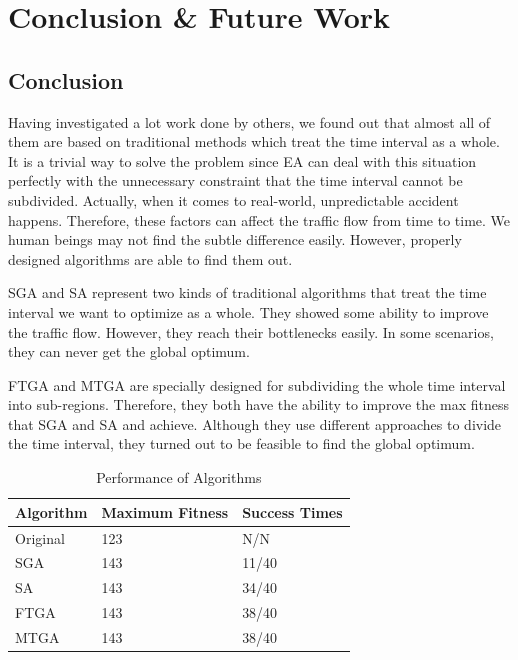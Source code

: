 \documentclass{article} %
\begin{document}
\section{Conclusion \& Future Work}
\subsection{Conclusion}
Having investigated a lot work done by others, we found out that almost all of them are based on traditional methods which treat the time interval as a whole. It is a trivial way to solve the problem since EA can deal with this situation perfectly with the unnecessary constraint that the time interval cannot be subdivided. Actually, when it comes to real-world, unpredictable accident happens. Therefore, these factors can affect the traffic flow from time to time. We human beings may not find the subtle difference easily. However, properly designed algorithms are able to find them out.

SGA and SA represent two kinds of traditional algorithms that treat the time interval we want to optimize as a whole. They showed some ability to improve the traffic flow. However, they reach their bottlenecks easily. In some scenarios, they can never get the global optimum. 

FTGA and MTGA are specially designed for subdividing the whole time interval into sub-regions. Therefore, they both have the ability to improve the max fitness that SGA and SA and achieve. Although they use different approaches to divide the time interval, they turned out to be feasible to find the global optimum. 

\begin{table}
\centering
\renewcommand\arraystretch{2}
    \begin{tabular}{|l|l|l|}
    \hline
    \textbf{Algorithm} & \textbf{Maximum Fitness} & \textbf{Success Times} \\ \hline
    Original  & 123             & N/N             \\ \hline
    SGA       & 143             & 11/40           \\ \hline
    SA        & 143             & 34/40           \\ \hline
    FTGA      & 143             & 38/40           \\ \hline
    MTGA      & 143             & 38/40           \\ \hline
    \end{tabular}
    \caption {Performance of Algorithms}
    \label{tab:pa}
\end{table}
\end{document}
